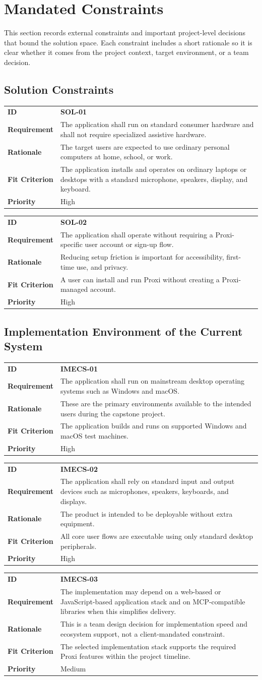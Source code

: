 \documentclass[12pt]{article}
\makeatletter
\newcommand{\reqcard}[5]{%
\noindent\begin{tabularx}{\textwidth}{@{}p{2.35cm}X@{}}
\textbf{ID} & \textbf{#1} \\
\textbf{Requirement} & #2 \\
\textbf{Rationale} & #3 \\
\textbf{Fit Criterion} & #4 \\
\textbf{Priority} & #5 \\
\end{tabularx}\par\medskip
}
\makeatother
\begin{document}
\section{Mandated Constraints}
This section records external constraints and important project-level
decisions that bound the solution space. Each constraint includes a
short rationale so it is clear whether it comes from the project
context, target environment, or a team decision.

\subsection{Solution Constraints}
\reqcard{SOL-01}{The application shall run on standard consumer
hardware and shall not require specialized assistive hardware.}{The
target users are expected to use ordinary personal computers at home,
school, or work.}{The application installs and operates on ordinary
laptops or desktops with a standard microphone, speakers, display, and
keyboard.}{High}

\reqcard{SOL-02}{The application shall operate without requiring a
Proxi-specific user account or sign-up flow.}{Reducing setup friction
is important for accessibility, first-time use, and privacy.}{A user
can install and run Proxi without creating a Proxi-managed
account.}{High}

\subsection{Implementation Environment of the Current System}
\reqcard{IMECS-01}{The application shall run on mainstream desktop
operating systems such as Windows and macOS.}{These are the primary
environments available to the intended users during the capstone
project.}{The application builds and runs on supported Windows and
macOS test machines.}{High}

\reqcard{IMECS-02}{The application shall rely on standard input and
output devices such as microphones, speakers, keyboards, and
displays.}{The product is intended to be deployable without extra
equipment.}{All core user flows are executable using only standard
desktop peripherals.}{High}

\reqcard{IMECS-03}{The implementation may depend on a web-based or
JavaScript-based application stack and on MCP-compatible libraries when
this simplifies delivery.}{This is a team design decision for
implementation speed and ecosystem support, not a client-mandated
constraint.}{The selected implementation stack supports the required
Proxi features within the project timeline.}{Medium}
\end{document}
